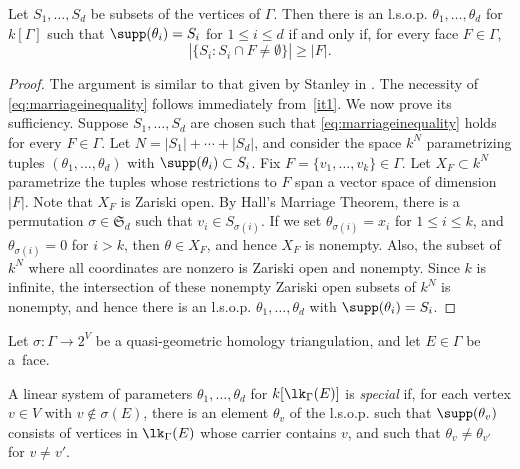 \begin{lemma} \label{lemma:lsopexistence}
Let $S_1, \ldots, S_d$ be subsets of the vertices of $\Gamma$.  Then there is an l.s.o.p. $\theta_1, \ldots, \theta_d$ for $k[\Gamma]$ such that $\supp (\theta_i) = S_i$ for $1 \leq i \leq d$ if and only if, for every face $F \in \Gamma$,
\begin{equation} \label{eq:marriageinequality}
| \{ S_i : S_i \cap F \neq \emptyset \}| \geq |F|.
\end{equation}
\end{lemma}

\begin{proof} 
The argument is similar to that given by Stanley in \cite[Corollary~4.4]{Stanley92}. The necessity of \eqref{eq:marriageinequality} follows immediately from~\ref{it1}. We now prove its sufficiency.  Suppose $S_1, \ldots, S_d$ are chosen such that \eqref{eq:marriageinequality} holds for every 
$F \in \Gamma$.    
Let $N = |S_1| + \cdots + |S_d|$, and consider the space $k^N$ 
parametrizing tuples $(\theta_1, \ldots, \theta_d)$
with $\supp (\theta_i) \subset S_i$.
Fix $F = \{v_1, \dotsc, v_k\} \in \Gamma$.
Let $X_F \subset k^N$  parametrize the tuples 
 whose restrictions to $F$ 
 span a vector space of dimension $|F|$.
Note that $X_F$ is Zariski open.  
By Hall's Marriage Theorem, there is a permutation $\sigma \in \mathfrak{S}_d$ such that $v_i \in S_{\sigma(i)}$. If we set $\theta_{\sigma(i)} = x_i$ for $1 \le i \le k$, and $\theta_{\sigma(i)} = 0$ for $i > k$, then $\theta \in X_F$, and hence $X_F$ is nonempty. Also, the subset of $k^N$ where all coordinates are nonzero is Zariski open and nonempty.  Since $k$ is infinite, the intersection of these nonempty Zariski open subsets of $k^N$ is nonempty, and hence there is an l.s.o.p. $\theta_1, \ldots, \theta_d$ with $\supp(\theta_i)= S_i$. 
\end{proof}




Let $\sigma \colon \Gamma \to 2^V$ be a quasi-geometric homology triangulation,   and let $E \in \Gamma$ be a~face. 

\begin{definition} \label{def:special} A linear system of parameters $\theta_1, \dotsc, \theta_{d}$ for $k[\lk_{\Gamma}(E)]$ is \textit{special} if, for each vertex $v \in V$ with $v \not \in \sigma(E)$, there is an element $\theta_v$ of the l.s.o.p. such that $\supp(\theta_v)$ consists of vertices in $\lk_{\Gamma}(E)$  whose carrier contains $v$, and such that $\theta_v \not= \theta_{v'}$ for $v \not= v'$. 
\end{definition}

